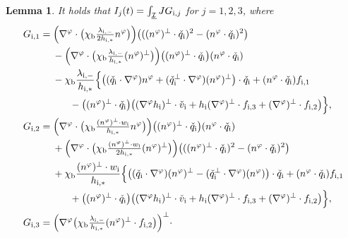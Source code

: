 \documentclass[JEP,XML,SOM,Unicode,NoFloatCountersInSection,published]{cedram}
\newcommand{\cI}{{\mathcal I}}
\newcommand{\ul}[1]{\underline{#1}}
\newtheorem{lemma}[theorem]{Lemma}
\theoremstyle{definition}
\begin{document}
\begin{lemma}\label{lem:Rellich2}
It holds that $I_j(t)=\int_{\ul{\cI}}JG_{{\rm i},j}$ for $j=1,2,3$, where
\begin{align*}
G_{{\rm i},1}
&= \Bigl(\nabla^\varphi\cdot\bigl(\chi_\mathrm{b}\tfrac{\lambda_{{\rm i},-}}{2h_{{\rm i},*}}n^\varphi \bigr) \Bigr)
\bigl(((n^\varphi)^\perp\cdot\check{q}_\mathrm{i})^2 - (n^\varphi\cdot\check{q}_\mathrm{i})^2\bigr) \\
&\quad\;
- \Bigl(\nabla^\varphi\cdot\bigl(\chi_\mathrm{b}\tfrac{\lambda_{{\rm i},-}}{h_{{\rm i},*}}(n^\varphi)^\perp \bigr) \Bigr)
\bigl((n^\varphi)^\perp\cdot\check{q}_\mathrm{i}\bigr)(n^\varphi\cdot\check{q}_\mathrm{i}) \\
&\quad\;
- \chi_\mathrm{b}\frac{\lambda_{{\rm i},-}}{h_{{\rm i},*}}\Bigl\{
\bigl((\check{q}_\mathrm{i}\cdot\nabla^\varphi)n^\varphi + (\check{q}_\mathrm{i}^\perp\cdot\nabla^\varphi)(n^\varphi)^\perp \bigr)\cdot\check{q}_\mathrm{i}
+ (n^\varphi\cdot\check{q}_\mathrm{i})f_{{\rm i},1} \\
&\makebox[3em]{}
- \bigl((n^\varphi)^\perp\cdot\check{q}_\mathrm{i}\bigr)\bigl((\nabla^\varphi h_\mathrm{i})^\perp\cdot\check{v}_\mathrm{i} + h_\mathrm{i}(\nabla^\varphi)^\perp\cdot f_{{\rm i},3}
+ (\nabla^\varphi)^\perp\cdot f_{{\rm i},2}\bigr) \Bigr\}, \\
G_{{\rm i},2}
&= \Bigl(\nabla^\varphi\cdot\bigl(\chi_\mathrm{b}\tfrac{(n^\varphi)^\perp\cdot w_\mathrm{i}}{h_{{\rm i},*}}n^\varphi \bigr) \Bigr)
\bigl((n^\varphi)^\perp\cdot\check{q}_\mathrm{i}\bigr)(n^\varphi\cdot\check{q}_\mathrm{i}) \\
&\quad\;
+ \Bigl(\nabla^\varphi\cdot\bigl(\chi_\mathrm{b}\tfrac{(n^\varphi)^\perp\cdot w_\mathrm{i}}{2h_{{\rm i},*}}(n^\varphi)^\perp \bigr) \Bigr)
\bigl(((n^\varphi)^\perp\cdot\check{q}_\mathrm{i})^2 - (n^\varphi\cdot\check{q}_\mathrm{i})^2\bigr) \\
&\quad\;
+ \chi_\mathrm{b}\frac{(n^\varphi)^\perp\cdot w_\mathrm{i}}{h_{{\rm i},*}}\Bigl\{
\bigl((\check{q}_\mathrm{i}\cdot\nabla^\varphi)(n^\varphi)^\perp - (\check{q}_\mathrm{i}^\perp\cdot\nabla^\varphi)(n^\varphi) \bigr)\cdot\check{q}_\mathrm{i}
+ (n^\varphi\cdot\check{q}_\mathrm{i})f_{{\rm i},1} \\
&\makebox[3em]{}
+ \bigl((n^\varphi)^\perp\cdot\check{q}_\mathrm{i}\bigr)\bigl((\nabla^\varphi h_\mathrm{i})^\perp\cdot\check{v}_\mathrm{i} + h_\mathrm{i}(\nabla^\varphi)^\perp\cdot f_{{\rm i},3}
+ (\nabla^\varphi)^\perp\cdot f_{{\rm i},2}\bigl) \Bigr\}, \\
G_{{\rm i},3}
&= \Bigl(\nabla^\varphi\bigl(\chi_\mathrm{b}\tfrac{\lambda_{{\rm i},-}}{h_{{\rm i},*}}(n^\varphi)^\perp\cdot f_{{\rm i},2} \bigr) \Bigr)^\perp\cdot

\end{align*}
\end{lemma}
\end{document}
